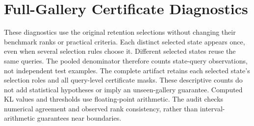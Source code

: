 \section{Full-Gallery Certificate Diagnostics}
\label{app:certificates}
These diagnostics use the original retention selections without changing their benchmark ranks or practical criteria.
Each distinct selected state appears once, even when several selection rules choose it.
Different selected states reuse the same queries.
The pooled denominator therefore counts state-query observations, not independent test examples.
The complete artifact retains each selected state's selection roles and all query-level certificate masks.
These descriptive counts do not add statistical hypotheses or imply an unseen-gallery guarantee.
Computed KL values and thresholds use floating-point arithmetic.
The audit checks numerical agreement and observed rank consistency, rather than interval-arithmetic guarantees near boundaries.
